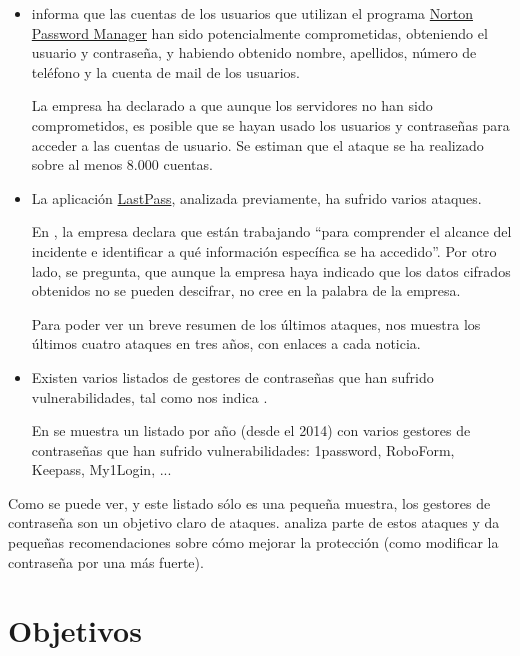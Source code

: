 \documentclass{\ClassPath/viu-tfm-template}
\begin{document}
\begin{itemize}
    \item \textcite{norton} informa que las cuentas de los usuarios que utilizan el programa \href{https://us.norton.com/feature/password-manager}{Norton Password Manager} han sido potencialmente comprometidas, obteniendo el usuario y contraseña, y habiendo obtenido nombre, apellidos, número de teléfono y la cuenta de mail de los usuarios.

    La empresa ha declarado a \textcite{norton2} que aunque los servidores no han sido comprometidos, es posible que se hayan usado los usuarios y contraseñas para acceder a las cuentas de usuario. Se estiman que el ataque se ha realizado sobre al menos 8.000 cuentas.

    \item La aplicación \href{https://www.lastpass.com/}{LastPass}, analizada previamente, ha sufrido varios ataques.

    En \textcite{lastpass}, la empresa declara que están trabajando “para comprender el alcance del incidente e identificar a qué información específica se ha accedido”. Por otro lado, \textcite{lastpass2} se pregunta, que aunque la empresa haya indicado que los datos cifrados obtenidos no se pueden descifrar, no cree en la palabra de la empresa.

    Para poder ver un breve resumen de los últimos ataques, \textcite{lastpass3} nos muestra los últimos cuatro ataques en tres años, con enlaces a cada noticia.

    \item Existen varios listados de gestores de contraseñas que han sufrido vulnerabilidades, tal como nos indica \textcite{hacked2}.

    En \textcite{hacked} se muestra un listado por año (desde el 2014) con varios gestores de contraseñas que han sufrido vulnerabilidades: 1password, RoboForm, Keepass, My1Login, ...

\end{itemize}

Como se puede ver, y este listado sólo es una pequeña muestra, los gestores de contraseña son un objetivo claro de ataques.  \textcite{hacked3} analiza parte de estos ataques y da pequeñas recomendaciones sobre cómo mejorar la protección (como modificar la contraseña por una más fuerte).

\chapter{Objetivos}
\end{document}
